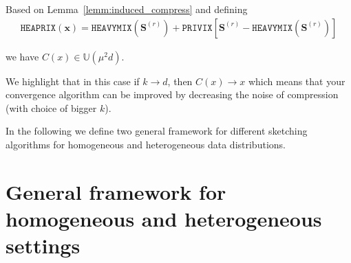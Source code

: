 \begin{corollary}
Based on Lemma~\ref{lemm:induced_compress} and defining 
\begin{align}
    \texttt{HEAPRIX}(\boldsymbol{x})=\texttt{HEAVYMIX}\left(\mathbf{S}^{(r)}\right)+\texttt{PRIVIX}\left[\mathbf{S}^{(r)}-\texttt{HEAVYMIX}\left(\mathbf{S}^{(r)}\right)\right]
\end{align}

we have $C(x)\in \mathbb{U}(\mu^2 d)$.
\end{corollary}
\begin{remark}
We highlight that in this case if $k\rightarrow d$, then $C(x)\rightarrow x$ which means that your convergence algorithm can be improved by decreasing the noise of compression (with choice of bigger $k$). 
\end{remark}

In the following we define two general framework for different sketching algorithms for homogeneous and heterogeneous data distributions.
\section{General framework for homogeneous and heterogeneous settings}

